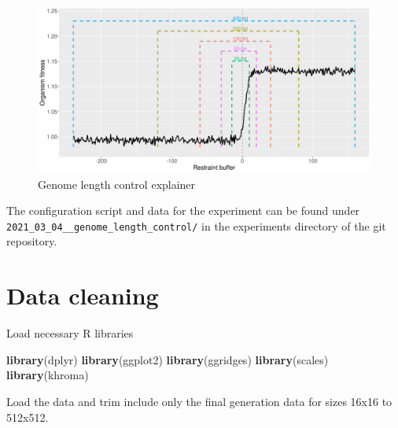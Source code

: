 \documentclass[
]{book}
\newenvironment{Shaded}{\begin{snugshade}}{\end{snugshade}}
\newcommand{\KeywordTok}[1]{\textcolor[rgb]{0.13,0.29,0.53}{\textbf{#1}}}
\newcommand{\NormalTok}[1]{#1}
\begin{document}
\begin{figure}
\centering
\includegraphics{./genome_length_control/timing_control_explanation.png}
\caption{Genome length control explainer}
\end{figure}

The configuration script and data for the experiment can be found under \texttt{2021\_03\_04\_\_genome\_length\_control/} in the experiments directory of the git repository.

\hypertarget{data-cleaning-6}{%
\section{Data cleaning}\label{data-cleaning-6}}

Load necessary R libraries

\begin{Shaded}
\begin{Highlighting}[]
\KeywordTok{library}\NormalTok{(dplyr)}
\KeywordTok{library}\NormalTok{(ggplot2)}
\KeywordTok{library}\NormalTok{(ggridges)}
\KeywordTok{library}\NormalTok{(scales)}
\KeywordTok{library}\NormalTok{(khroma)}
\end{Highlighting}
\end{Shaded}

Load the data and trim include only the final generation data for sizes 16x16 to 512x512.
\end{document}
